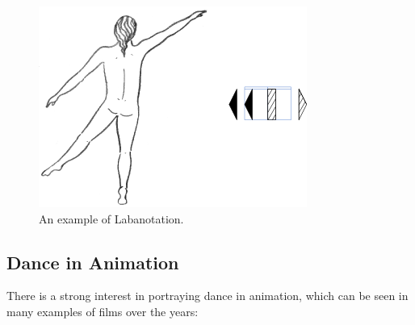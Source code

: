\begin{figure}[!h]
\centering
\includegraphics[scale=0.5]{img/over-labanotation}
\caption{An example of Labanotation.}
\end{figure}

\subsection{Dance in Animation}
There is a strong interest in portraying dance in animation, which can be seen in many examples of films over the years:

